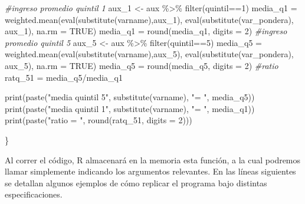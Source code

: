 \documentclass[
]{book}
\newenvironment{Shaded}{\begin{snugshade}}{\end{snugshade}}
\newcommand{\AttributeTok}[1]{\textcolor[rgb]{0.77,0.63,0.00}{#1}}
\newcommand{\CommentTok}[1]{\textcolor[rgb]{0.56,0.35,0.01}{\textit{#1}}}
\newcommand{\ConstantTok}[1]{\textcolor[rgb]{0.00,0.00,0.00}{#1}}
\newcommand{\DecValTok}[1]{\textcolor[rgb]{0.00,0.00,0.81}{#1}}
\newcommand{\FunctionTok}[1]{\textcolor[rgb]{0.00,0.00,0.00}{#1}}
\newcommand{\NormalTok}[1]{#1}
\newcommand{\OtherTok}[1]{\textcolor[rgb]{0.56,0.35,0.01}{#1}}
\newcommand{\SpecialCharTok}[1]{\textcolor[rgb]{0.00,0.00,0.00}{#1}}
\newcommand{\StringTok}[1]{\textcolor[rgb]{0.31,0.60,0.02}{#1}}
\begin{document}
\begin{Shaded}
\begin{Highlighting}[numbers=left,,]
    \CommentTok{\#ingreso promedio quintil 1 }
\NormalTok{    aux\_1 }\OtherTok{\textless{}{-}}\NormalTok{ aux }\SpecialCharTok{\%\textgreater{}\%} \FunctionTok{filter}\NormalTok{(quintil}\SpecialCharTok{==}\DecValTok{1}\NormalTok{) }
\NormalTok{    media\_q1 }\OtherTok{=} \FunctionTok{weighted.mean}\NormalTok{(}\FunctionTok{eval}\NormalTok{(}\FunctionTok{substitute}\NormalTok{(varname),aux\_1), }\FunctionTok{eval}\NormalTok{(}\FunctionTok{substitute}\NormalTok{(var\_pondera), aux\_1), }\AttributeTok{na.rm =} \ConstantTok{TRUE}\NormalTok{)}
\NormalTok{    media\_q1 }\OtherTok{=} \FunctionTok{round}\NormalTok{(media\_q1, }\AttributeTok{digits =} \DecValTok{2}\NormalTok{)}
    \CommentTok{\#ingreso promedio quintil 5 }
\NormalTok{    aux\_5 }\OtherTok{\textless{}{-}}\NormalTok{ aux }\SpecialCharTok{\%\textgreater{}\%} \FunctionTok{filter}\NormalTok{(quintil}\SpecialCharTok{==}\DecValTok{5}\NormalTok{) }
\NormalTok{    media\_q5 }\OtherTok{=} \FunctionTok{weighted.mean}\NormalTok{(}\FunctionTok{eval}\NormalTok{(}\FunctionTok{substitute}\NormalTok{(varname),aux\_5), }\FunctionTok{eval}\NormalTok{(}\FunctionTok{substitute}\NormalTok{(var\_pondera), aux\_5), }\AttributeTok{na.rm =} \ConstantTok{TRUE}\NormalTok{)}
\NormalTok{    media\_q5 }\OtherTok{=} \FunctionTok{round}\NormalTok{(media\_q5, }\AttributeTok{digits =} \DecValTok{2}\NormalTok{)}
    \CommentTok{\#ratio}
\NormalTok{    ratq\_51 }\OtherTok{=}\NormalTok{ media\_q5}\SpecialCharTok{/}\NormalTok{media\_q1}
    
    
    \FunctionTok{print}\NormalTok{(}\FunctionTok{paste}\NormalTok{(}\StringTok{"media quintil 5"}\NormalTok{, }\FunctionTok{substitute}\NormalTok{(varname), }\StringTok{"= "}\NormalTok{, media\_q5))}
    \FunctionTok{print}\NormalTok{(}\FunctionTok{paste}\NormalTok{(}\StringTok{"media quintil 1"}\NormalTok{, }\FunctionTok{substitute}\NormalTok{(varname), }\StringTok{"= "}\NormalTok{, media\_q1))}
    \FunctionTok{print}\NormalTok{(}\FunctionTok{paste}\NormalTok{(}\StringTok{"ratio = "}\NormalTok{, }\FunctionTok{round}\NormalTok{(ratq\_51, }\AttributeTok{digits =} \DecValTok{2}\NormalTok{)))}
    
  
\NormalTok{\}}
\end{Highlighting}
\end{Shaded}

Al correr el código, R almacenará en la memoria esta función, a la cual podremos llamar simplemente indicando los argumentos relevantes. En las líneas siguientes se detallan algunos ejemplos de cómo replicar el programa bajo distintas especificaciones.
\end{document}
